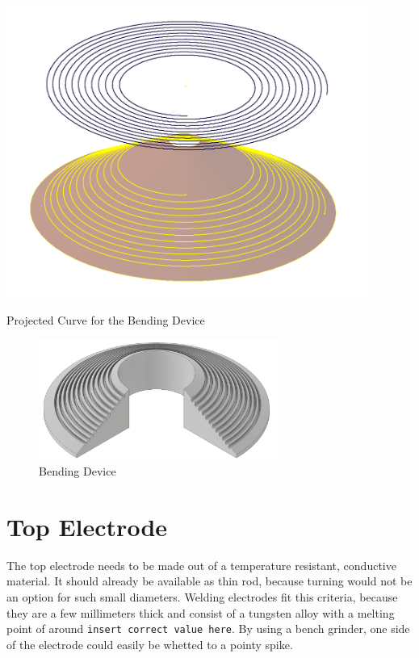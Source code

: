 \begin{marginfigure}[-3cm]
    \centering
    \includegraphics[width=0.9\textwidth]{kassandra/resources/JerJerWoBistDuSpirae.PNG}
    \caption{Projected Curve for the Bending Device}
    \label{fig:spirae}
\end{marginfigure}

\begin{figure}[h!]
    \centering
    \includegraphics[width=0.7\textwidth]{kassandra/resources/JerJerWoBistDuBiegeBieg.PNG}
    \caption{Bending Device}
    \label{fig:biegbieg}
\end{figure}

\section{Top Electrode}

The top electrode needs to be made out of a temperature resistant, conductive material. It should already be available as thin rod, because turning would not be an option for such small diameters. Welding electrodes fit this criteria, because they are a few millimeters thick and consist of a tungsten alloy with a melting point of around \texttt{insert correct value here}. By using a bench grinder, one side of the electrode could easily be whetted to a pointy spike.

